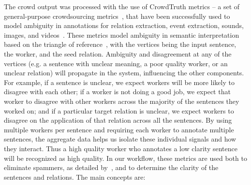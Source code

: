 The crowd output was processed with the use of CrowdTruth metrics -- a set of general-purpose crowdsourcing metrics~\cite{inel2014crowdtruth}, that have been successfully used to model ambiguity in annotations for relation extraction, event extraction, sounds, images, and videos~\cite{aroyo2014threesides}.  These metrics model ambiguity in semantic interpretation based on the triangle of reference~\cite{Ogden1923}, with the vertices being the input sentence, the worker, and the seed relation.  Ambiguity and disagreement at any of the vertices (e.g. a sentence with unclear meaning, a poor quality worker, or an unclear relation) will propagate in the system, influencing the other components.  For example, if a sentence is unclear, we expect workers will be more likely to disagree with each other; if a worker is not doing a good job, we expect that worker to disagree with other workers across the majority of the sentences they worked on; and if a particular target relation is unclear, we expect workers to disagree on the application of that relation across all the sentences. By using multiple workers per sentence and requiring each worker to annotate multiple sentences, the aggregate data helps us isolate these individual signals and how they interact.  Thus a high quality worker who annotates a low clarity sentence will be recognized as high quality. In our workflow, these metrics are used both to eliminate spammers, as detailed by~\cite{aroyo2014threesides}, and to determine the clarity of the sentences and relations. The main concepts are:

